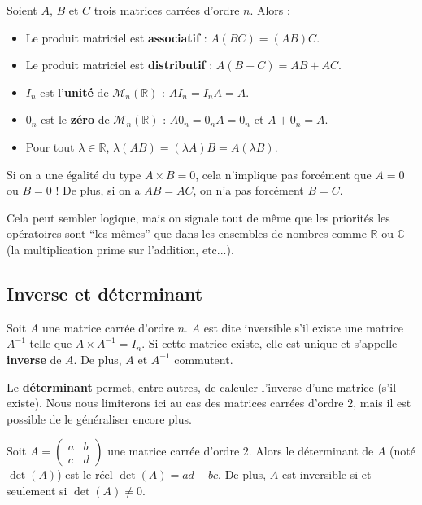 	\begin{formula}
		Soient $A$, $B$ et $C$ trois matrices carrées d'ordre $n$. Alors :
		\begin{itemize}
			\item Le produit matriciel est \textbf{associatif} : $A(BC) = (AB)C$.
			\item Le produit matriciel est \textbf{distributif} : $A(B + C) = AB + AC$.
			\item $I_n$ est l'\textbf{unité} de $\mathcal{M}_{n}(\mathbb{R})$ : $AI_n = I_nA = A$.
			\item $0_n$ est le \textbf{zéro} de $\mathcal{M}_{n}(\mathbb{R})$ : $A0_n = 0_nA = 0_n$ et $A + 0_n = A$.
			\item Pour tout $\lambda \in \mathbb{R}$, $\lambda (AB) = (\lambda A)B = A(\lambda B)$.
		\end{itemize}
	\end{formula}
	
	\begin{tip}[Attention !]
		Si on a une égalité du type $A \times B = 0$, cela n'implique pas forcément que $A = 0$ ou $B = 0$ !
		\newpar
		De plus, si on a $AB = AC$, on n'a pas forcément $B = C$.
	\end{tip}
	
	Cela peut sembler logique, mais on signale tout de même que les priorités les opératoires sont ``les mêmes'' que dans les ensembles de nombres comme $\mathbb{R}$ ou $\mathbb{C}$ (la multiplication prime sur l'addition, etc...).
	
	\subsection{Inverse et déterminant}
	
	\begin{formula}
		Soit $A$ une matrice carrée d'ordre $n$. $A$ est dite inversible s'il existe une matrice $A^{-1}$ telle que $A \times A^{-1} = I_n$.
		\newpar
		Si cette matrice existe, elle est unique et s'appelle \textbf{inverse} de $A$. De plus, $A$ et $A^{-1}$ commutent.
	\end{formula}
	
	Le \textbf{déterminant} permet, entre autres, de calculer l'inverse d'une matrice (s'il existe). Nous nous limiterons ici au cas des matrices carrées d'ordre $2$, mais il est possible de le généraliser encore plus.
	
	\begin{formula}
		Soit $\displaystyle{A = \begin{pmatrix} a & b \\ c & d \end{pmatrix}}$ une matrice carrée d'ordre $2$.
		\newpar
		Alors le déterminant de $A$ (noté $\det(A)$) est le réel $\det(A) = ad - bc$. De plus, $A$ est inversible si et seulement si $\det(A) \neq 0$.
	\end{formula}
	

